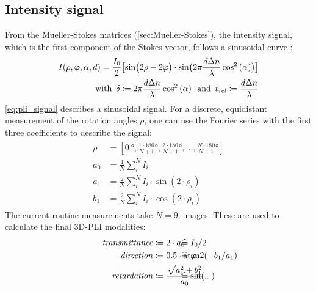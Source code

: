 \subsection{Intensity signal}\label{sec::intSignal}
%
From the Mueller-Stokes matrices (\cref{sec:Mueller-Stokes}), the intensity signal, which is the first component of the Stokes vector, follows a sinusoidal curve \cite{MenzelMaster,MenzelDissertation}:
%
\begin{align}
\label{eq:pli_signal}
\begin{split}
I(\rho, \varphi, \alpha, d) =\frac{I_0}{2}\bigl[ \sin\bigl(2\rho - 2\varphi \bigr)\cdot \sin \bigl( 2\pi\frac{d \textnormal{$\Delta n$}}{\lambda} \cos^2\left( \alpha \right) \bigr) \bigr] \\
\text{with} \enspace \delta \coloneqq 2\pi\frac{d \textnormal{$\Delta n$}}{\lambda} \cos^2\left( \alpha \right) \enspace
\text{and} \enspace \textnormal{$t_\mathit{rel}$} \coloneqq \frac{d \textnormal{$\Delta n$}}{\lambda}
\end{split}
\end{align}
%
\cref{eq:pli_signal} describes a sinusoidal signal.
For a discrete, equidistant measurement of the rotation angles $\rho$, one can use the Fourier series with the first three coefficients to describe the signal:
%
\begin{align}
\begin{split}
\rho &= [\SI{0}{\degree}, \frac{1\cdot180}{N+1}\si{\degree}, \frac{2\cdot180}{N+1}\si{\degree}, ..., \frac{N\cdot180}{N+1}\si{\degree}]\\
a_0 &= \frac{1}{N} \sum_i^N I_i\\
a_1 &= \frac{2}{N} \sum_i^N I_i \cdot \sin(2 \cdot \rho_i)\\
b_1 &= \frac{2}{N} \sum_i^N I_i \cdot \cos(2 \cdot \rho_i)
\end{split}
\end{align}
%
The current routine measurements take $N=\SI{9}{}$ images.
These are used to calculate the final \ac{3D-PLI} modalities:
%
\begin{align}
\begin{split}
\mathit{transmittance} &\coloneqq 2 \cdot a_0 \vphantom{I_0/2} \\
\mathit{direction} &\coloneqq 0.5 \cdot \atantwo(-b_1 / a_1) \vphantom{\varphi} \\
\mathit{retardation} &\coloneqq \frac{\sqrt{a_1^2 + b_1^2}}{a_0}  \vphantom{\sin(...)}
\end{split}
\hspace{-7em}
\begin{split}
& \mathrel{\widehat{=}} I_0/2 \vphantom{2 \cdot a_0}\\
& \mathrel{\widehat{=}} \varphi \vphantom{0.5 \cdot \atantwo(-b_1 / a_1)} \\
& \mathrel{\widehat{=}} \sin(...) \vphantom{\frac{\sqrt{a_1^2 + b_1^2}}{a_0}}
\end{split}
\end{align}

